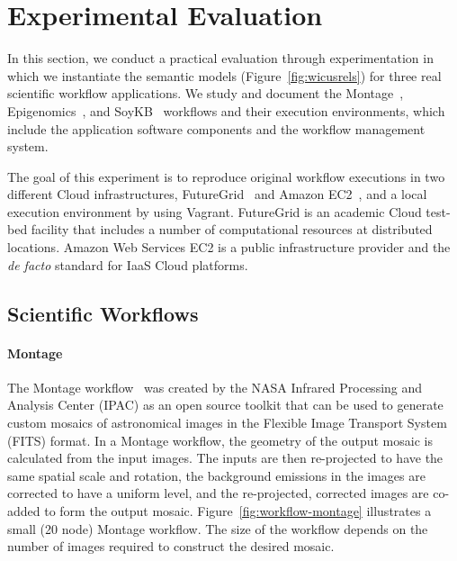 \section{Experimental Evaluation}
\label{sec:experiment}

In this section, we conduct a practical evaluation through experimentation in 
which we instantiate the semantic models (Figure~\ref{fig:wicusrels}) for three real 
scientific workflow applications. We study and document the Montage~\cite{Montage},
Epigenomics~\cite{genome}, and SoyKB~\cite{soybean, Joshi01012014} workflows 
and their execution environments, which include the application software components 
and the workflow management system.

The goal of this experiment is to reproduce original workflow executions in two different 
Cloud infrastructures, FutureGrid~\cite{futuregrid} and Amazon EC2~\cite{aws}, and a
local execution environment by using Vagrant. 
FutureGrid is an academic Cloud test-bed facility that includes a number of computational 
resources at distributed locations. Amazon Web Services EC2 is a public infrastructure 
provider and the \emph{de facto} standard for IaaS Cloud platforms. 


\subsection{Scientific Workflows}

\paragraph{\textbf{Montage}}
The Montage workflow~\cite{Montage} was created by the NASA Infrared Processing 
and Analysis Center (IPAC) as an open source toolkit that can be used to generate 
custom mosaics of astronomical images in the Flexible Image Transport System (FITS) 
format. In a Montage workflow, the geometry of the output mosaic is calculated from the 
input images. The inputs are then re-projected to have the same spatial scale and rotation, 
the background emissions in the images are corrected to have a uniform level, and the 
re-projected, corrected images are co-added to form the output mosaic. 
Figure~\ref{fig:workflow-montage} illustrates a small (20 node) Montage workflow. The 
size of the workflow depends on the number of images required to construct the desired 
mosaic.

